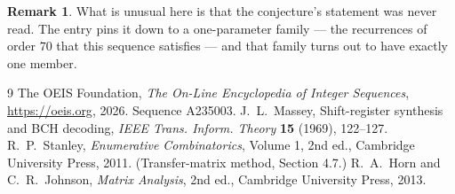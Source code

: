 \documentclass[11pt,a4paper]{article}
\theoremstyle{plain}
\theoremstyle{definition}
\newtheorem{remark}[theorem]{Remark}
\begin{document}
\begin{remark}
What is unusual here is that the conjecture's statement was never read. The entry pins it down
to a one-parameter family --- the recurrences of order $70$ that this sequence satisfies
--- and that family turns out to have exactly one member.
\end{remark}

\begin{thebibliography}{9}
 The OEIS Foundation, \emph{The On-Line Encyclopedia of Integer
Sequences}, \url{https://oeis.org}, 2026. Sequence A235003.
 J.~L.~Massey, Shift-register synthesis and BCH decoding, \emph{IEEE
Trans. Inform. Theory} \textbf{15} (1969), 122--127.
 R.~P.~Stanley, \emph{Enumerative Combinatorics}, Volume 1, 2nd ed.,
Cambridge University Press, 2011. (Transfer-matrix method, Section 4.7.)
 R.~A.~Horn and C.~R.~Johnson, \emph{Matrix Analysis}, 2nd ed., Cambridge
University Press, 2013.
\end{thebibliography}
\end{document}
